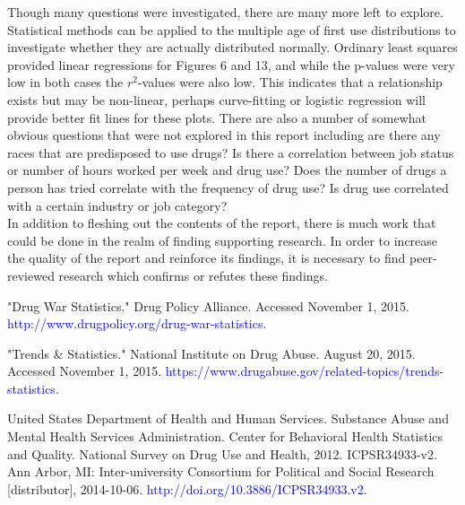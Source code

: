 \documentclass[a4 paper]{article}
\begin{document}
Though many questions were investigated, there are many more left to explore. Statistical methods can be applied to the multiple age of first use distributions to investigate whether they are actually distributed normally. Ordinary least squares provided linear regressions for Figures 6 and 13, and while the p-values were very low in both cases the $r^2$-values were also low. This indicates that a relationship exists but may be non-linear, perhaps curve-fitting or logistic regression will provide better fit lines for these plots. There are also a number of somewhat obvious questions that were not explored in this report including are there any races that are predisposed to use drugs? Is there a correlation between job status or number of hours worked per week and drug use? Does the number of drugs a person has tried correlate with the frequency of drug use? Is drug use correlated with a certain industry or job category?\\

In addition to fleshing out the contents of the report, there is much work that could be done in the realm of finding supporting research. In order to increase the quality of the report and reinforce its findings, it is necessary to find peer-reviewed research which confirms or refutes these findings.

\begin{thebibliography}{1}
	
	 "Drug War Statistics." Drug Policy Alliance. Accessed November 1, 2015. \textcolor{blue}{http://www.drugpolicy.org/drug-war-statistics}.
	
	  "Trends \& Statistics." National Institute on Drug Abuse. August 20, 2015. Accessed November 1, 2015. \textcolor{blue}{https://www.drugabuse.gov/related-topics/trends-statistics}. 
	
	 United States Department of Health and Human Services. Substance Abuse and Mental Health Services Administration. Center for Behavioral Health Statistics and Quality. National Survey on Drug Use and Health, 2012. ICPSR34933-v2. Ann Arbor, MI: Inter-university Consortium for Political and Social Research [distributor], 2014-10-06. \textcolor{blue}{http://doi.org/10.3886/ICPSR34933.v2}.
	
\end{thebibliography}
\end{document}
